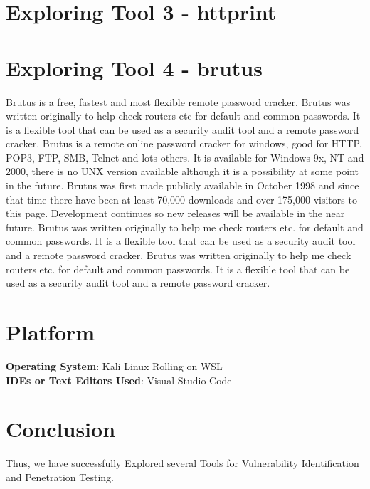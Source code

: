 \documentclass[11pt]{article}
\begin{document}
\section{Exploring Tool 3 - httprint}


\section{Exploring Tool 4 - brutus}
Brutus is a free, fastest and most flexible remote password cracker. Brutus was written originally to help check routers etc for default and common passwords. It is a flexible tool that can be used as a security audit tool and a remote password cracker. Brutus is a remote online password cracker for windows, good for HTTP, POP3, FTP, SMB, Telnet and lots others. It is available for Windows 9x, NT and 2000, there is no UN\*X version available although it is a possibility at some point in the future. Brutus was first made publicly available in October 1998 and since that time there have been at least 70,000 downloads and over 175,000 visitors to this page. Development continues so new releases will be available in the near future. Brutus was written originally to help me check routers etc. for default and common passwords. It is a flexible tool that can be used as a security audit tool and a remote password cracker. Brutus was written originally to help me check routers etc. for default and common passwords. It is a flexible tool that can be used as a security audit tool and a remote password cracker.


\section{Platform}
\textbf{Operating System}: Kali Linux Rolling on WSL\\
\textbf{IDEs or Text Editors Used}: Visual Studio Code\\

% 

\section{Conclusion}
Thus, we have successfully Explored several Tools for Vulnerability Identification and Penetration Testing.

\clearpage

\pagebreak
\end{document}
